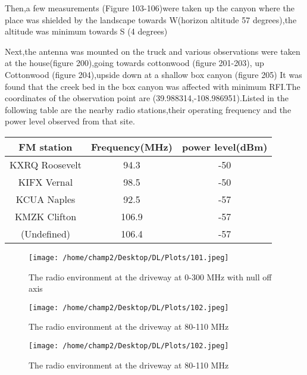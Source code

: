 \documentclass[11pt]{article}
\begin{document}
Then,a few measurements (Figure 103-106)were taken up the canyon where the place was shielded by the landscape towards W(horizon altitude 57 degrees),the altitude was minimum towards S (4 degrees) 

Next,the antenna was mounted on the truck and various observations were taken at the house(figure 200),going towards cottonwood (figure 201-203), up Cottonwood (figure 204),upside down at a shallow box canyon (figure 205)
It was found that the creek bed in the box canyon was affected with minimum RFI.The coordinates of the observation point are (39.988314,-108.986951).Listed in the following table are the nearby radio stations,their operating frequency and the power level observed from that site.
\begin{center}
	\begin{tabular}{ |c|c|c| } 
 	\hline
 	FM station		& Frequency(MHz)	& power level(dBm) \\
 	\hline
 	KXRQ Roosevelt & 94.3 & -50 \\
 	\hline
 	KIFX Vernal 	& 98.5	& -50 \\
 	\hline 
 	KCUA Naples 	& 92.5 & -57 \\
 	\hline
 	KMZK Clifton	& 106.9 	&-57 \\
 	\hline
 	(Undefined) 	& 106.4 & -57 \\
 	\hline
 	\end{tabular}
\end{center}

\begin{figure}
	\begin{center}
	\texttt{[image: /home/champ2/Desktop/DL/Plots/101.jpeg]}
	\end{center}
	\caption{
	The radio environment at the driveway at 0-300 MHz with null off axis  
	}
\end{figure}

\begin{figure}
	\begin{center}
	\texttt{[image: /home/champ2/Desktop/DL/Plots/102.jpeg]}
	\end{center}
	\caption{
		The radio environment at the driveway at 80-110 MHz  
	}
\end{figure}


\begin{figure}
	\begin{center}
	\texttt{[image: /home/champ2/Desktop/DL/Plots/102.jpeg]}
	\end{center}
	\caption{
		The radio environment at the driveway at 80-110 MHz  
	}
\end{figure}
\end{document}
